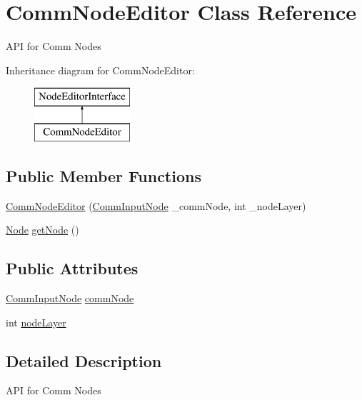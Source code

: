 \hypertarget{class_comm_node_editor}{}\section{Comm\+Node\+Editor Class Reference}
\label{class_comm_node_editor}


A\+PI for Comm Nodes  


Inheritance diagram for Comm\+Node\+Editor\+:\begin{figure}[H]
\begin{center}
\leavevmode
\includegraphics[height=2.000000cm]{class_comm_node_editor}
\end{center}
\end{figure}
\subsection*{Public Member Functions}
\begin{DoxyCompactItemize}
\item 
\mbox{\hyperlink{class_comm_node_editor_aca81fedc55a41cfbd42f8e00f05a7f32}{Comm\+Node\+Editor}} (\mbox{\hyperlink{class_comm_input_node}{Comm\+Input\+Node}} \+\_\+comm\+Node, int \+\_\+node\+Layer)
\item 
\mbox{\hyperlink{class_node}{Node}} \mbox{\hyperlink{class_comm_node_editor_ad578649fe7c3775e0b91c1acdb5e738a}{get\+Node}} ()
\end{DoxyCompactItemize}
\subsection*{Public Attributes}
\begin{DoxyCompactItemize}
\item 
\mbox{\hyperlink{class_comm_input_node}{Comm\+Input\+Node}} \mbox{\hyperlink{class_comm_node_editor_a36b489d896bf2c7cb2128f3b139008d2}{comm\+Node}}
\item 
int \mbox{\hyperlink{class_comm_node_editor_a23b382bbd6d5fc07966f04e09bd75093}{node\+Layer}}
\end{DoxyCompactItemize}


\subsection{Detailed Description}
A\+PI for Comm Nodes 



